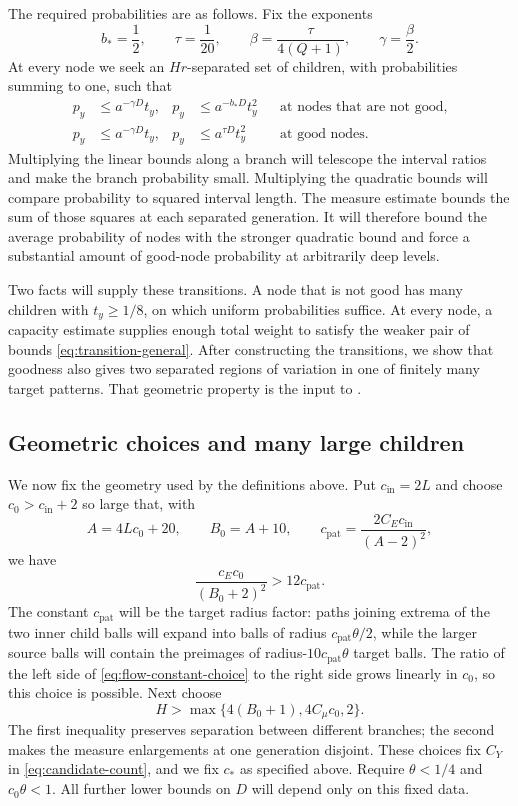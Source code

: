 The required probabilities are as follows. Fix the exponents
\begin{equation}
 b_* =\frac12,\qquad \tau=\frac1{20},\qquad
 \beta=\frac{\tau}{4(Q+1)},\qquad \gamma=\frac\beta2.
 \label{eq:flow-exponents}
\end{equation}
At every node we seek an $Hr$-separated set of children, with
probabilities summing to one, such that
\begin{align}
 p_y&\leq a^{-\gamma D}t_y,
 &p_y&\leq a^{-b_*D}t_y^2
 &&\text{at nodes that are not good},\label{eq:transition-bad}\\
 p_y&\leq a^{-\gamma D}t_y,
 &p_y&\leq a^{\tau D}t_y^2
 &&\text{at good nodes}.\label{eq:transition-general}
\end{align}
Multiplying the linear bounds along a branch will telescope the
interval ratios and make the branch probability small. Multiplying
the quadratic bounds will compare probability to squared interval
length. The measure estimate bounds the sum of those squares at
each separated generation. It will therefore bound the average
probability of nodes with the stronger quadratic bound and force a
substantial amount of good-node probability at arbitrarily deep levels.

Two facts will supply these transitions. A node that is not good has
many children with $t_y\ge1/8$, on which uniform probabilities suffice.
At every node, a capacity estimate supplies enough total weight to
satisfy the weaker pair of bounds \eqref{eq:transition-general}.
After constructing the transitions, we show that goodness also gives
two separated regions of variation in one of finitely many target
patterns. That geometric property is the input to .

\subsection{Geometric choices and many large children}

We now fix the geometry used by the definitions above. Put
$c_{\mathrm{in}}=2L$ and choose $c_0>c_{\mathrm{in}}+2$ so large that,
with
\[
 A=4Lc_0+20,\qquad B_0=A+10,\qquad
 c_{\mathrm{pat}}=\frac{2C_Ec_{\mathrm{in}}}{(A-2)^2},
\]
we have
\begin{equation}
 \frac{c_Ec_0}{(B_0+2)^2}>12c_{\mathrm{pat}}.
 \label{eq:flow-constant-choice}
\end{equation}
The constant $c_{\mathrm{pat}}$ will be the target radius factor:
paths joining extrema of the two inner child balls will expand into balls of radius
$c_{\mathrm{pat}}\theta/2$, while the larger source balls will contain
the preimages of radius-$10c_{\mathrm{pat}}\theta$ target balls.
The ratio of the left side of \eqref{eq:flow-constant-choice} to the
right side grows linearly in $c_0$, so this choice is possible.
Next choose
\[
 H>\max\{4(B_0+1),4C_{\mu}c_0,2\}.
\]
The first inequality preserves separation between different branches;
the second makes the measure enlargements at one generation disjoint.
These choices fix $C_Y$ in \eqref{eq:candidate-count}, and we fix
$c_*$ as specified above. Require $\theta<1/4$ and $c_0\theta<1$.
All further lower bounds on $D$ will depend only on this fixed data.


